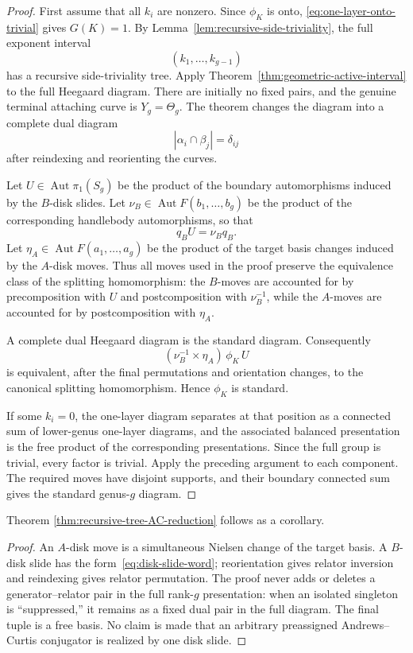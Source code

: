 \documentclass{article}
\DeclareMathOperator{\Aut}{Aut}
\begin{document}
\begin{proof}
First assume that all \(k_i\) are nonzero.  Since \(\phi_K\) is onto,
\eqref{eq:one-layer-onto-trivial} gives \(G(K)=1\).  By Lemma~\ref{lem:recursive-side-triviality}, the full exponent interval
\[
 (k_1,\ldots,k_{g-1})
\]
has a recursive side-triviality tree.  Apply Theorem~\ref{thm:geometric-active-interval} to the full Heegaard diagram.
There are initially no fixed pairs, and the genuine terminal attaching curve
is \(Y_g=\Theta_g\).  The theorem changes the diagram into a complete dual
diagram
\[
 |\alpha_i\cap\beta_j|=\delta_{ij}
\]
after reindexing and reorienting the curves.

Let \(U\in\Aut\pi_1(S_g)\) be the product of the boundary automorphisms
induced by the \(B\)-disk slides.  Let \(\nu_B\in\Aut F(b_1,\ldots,b_g)\)
be the product of the corresponding handlebody automorphisms, so that
\[
 q_B U=\nu_B q_B.
\]
Let \(\eta_A\in\Aut F(a_1,\ldots,a_g)\) be the product of the target basis
changes induced by the \(A\)-disk moves.  Thus all moves used in the proof
preserve the equivalence class of the splitting homomorphism: the
\(B\)-moves are accounted for by precomposition with \(U\) and
postcomposition with \(\nu_B^{-1}\), while the \(A\)-moves are accounted for
by postcomposition with \(\eta_A\).

A complete dual Heegaard diagram is the standard diagram.  Consequently
\[
 (\nu_B^{-1}\times\eta_A)\,\phi_K\,U
\]
is equivalent, after the final permutations and orientation changes, to the
canonical splitting homomorphism.  Hence \(\phi_K\) is standard.

If some \(k_i=0\), the one-layer diagram separates at that position as a
connected sum of lower-genus one-layer diagrams, and the associated balanced
presentation is the free product of the corresponding presentations.  Since
the full group is trivial, every factor is trivial.  Apply the preceding
argument to each component.  The required moves have disjoint supports, and
their boundary connected sum gives the standard genus-\(g\) diagram.
\end{proof}

Theorem \ref{thm:recursive-tree-AC-reduction} follows as a corollary.

\begin{proof}
An \(A\)-disk move is a simultaneous Nielsen change of the target basis.  A
\(B\)-disk slide has the form~\eqref{eq:disk-slide-word}; reorientation gives
relator inversion and reindexing gives relator permutation.  The proof never
adds or deletes a generator--relator pair in the full rank-\(g\) presentation:
when an isolated singleton is ``suppressed,'' it remains as a fixed dual pair
in the full diagram.  The final tuple is a free basis.  No claim is made that
an arbitrary preassigned Andrews--Curtis conjugator is realized by one disk
slide.
\end{proof}
\end{document}
